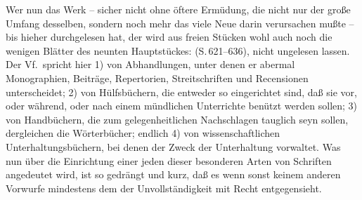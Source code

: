Wer nun das Werk -- sicher nicht ohne öftere Ermüdung, die nicht nur der große Umfang desselben, sondern noch mehr das viele Neue darin verursachen mußte -- bis hieher durchgelesen hat, der wird aus freien Stücken wohl auch noch die wenigen Blätter des neunten Hauptstückes:  (S.\,621--636), nicht ungelesen lassen. Der Vf.\ spricht hier 1) von Abhandlungen, unter denen er abermal Monographien, Beiträge, Repertorien, Streitschriften und Recensionen unterscheidet; 2) von Hülfsbüchern, die entweder so eingerichtet sind, daß sie vor, oder während, oder nach einem  mündlichen Unterrichte benützt werden sollen; 3) von Handbüchern, die zum gelegenheitlichen Nachschlagen tauglich seyn sollen, dergleichen die Wörterbücher; endlich 4) von wissenschaftlichen Unterhaltungsbüchern, bei denen der Zweck der Unterhaltung vorwaltet. Was nun über die Einrichtung einer jeden dieser besonderen Arten von Schriften angedeutet wird, ist so gedrängt und kurz, daß es wenn sonst keinem anderen Vorwurfe mindestens dem der Unvollständigkeit mit Recht entgegensieht. \par 
\endinput

